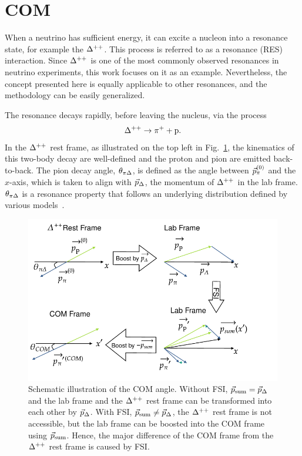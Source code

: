\section{COM}
\label{sec:mc-com}
When a neutrino has sufficient energy, it can excite a nucleon into a resonance state, for example the $\Delta^{++}$. 
This process is referred to as a resonance (RES) interaction.
Since $\Delta^{++}$ is one of the most commonly observed resonances in neutrino experiments, this work focuses on it as an example.
Nevertheless, the concept presented here is equally applicable to other resonances, and the methodology can be easily generalized.

The resonance decays rapidly, before leaving the nucleus, via the process
\begin{equation}
     \Delta^{++} \rightarrow \pi^+ + \textrm{p}.
\end{equation}
In the $\Delta^{++}$ rest frame, as illustrated on the top left in Fig.~\ref{fig:COM-diagram}, the kinematics of this two-body decay are well-defined and the proton and pion are emitted back-to-back.
The pion decay angle, $\theta_{\pi\Delta}$, is defined as the angle between $\vec{p}_{\pi}^{(0)}$ and the $x$-axis, which is taken to align with $\vec{p}_{\Delta}$, the momentum of $\Delta^{++}$ in the lab frame. 
$\theta_{\pi\Delta}$ is a resonance property that follows an underlying distribution defined by various models~\cite{Rein:1987cb,Kabirnezhad:2017jmf,Kabirnezhad:2020wtp,Kabirnezhad:2022znc}.

\begin{figure}[ht!]
\centering
\includegraphics[width=\linewidth]{figures/COM/COM-diagram.pdf}
\caption{Schematic illustration of the COM angle. Without FSI, $\vec{p}_{\textrm{sum}}=\vec{p}_{\Delta}$ and the lab frame and the $\Delta^{++}$ rest frame can be transformed into each other by $\vec{p}_{\Delta}$. With FSI, $\vec{p}_{\textrm{sum}} \neq \vec{p}_{\Delta}$, the $\Delta^{++}$ rest frame is not accessible, but the lab frame can be boosted into the COM frame using $\vec{p}_{\textrm{sum}}$. Hence, the major difference of the COM frame from the $\Delta^{++}$ rest frame is caused by FSI.}
\label{fig:COM-diagram}
\end{figure}

